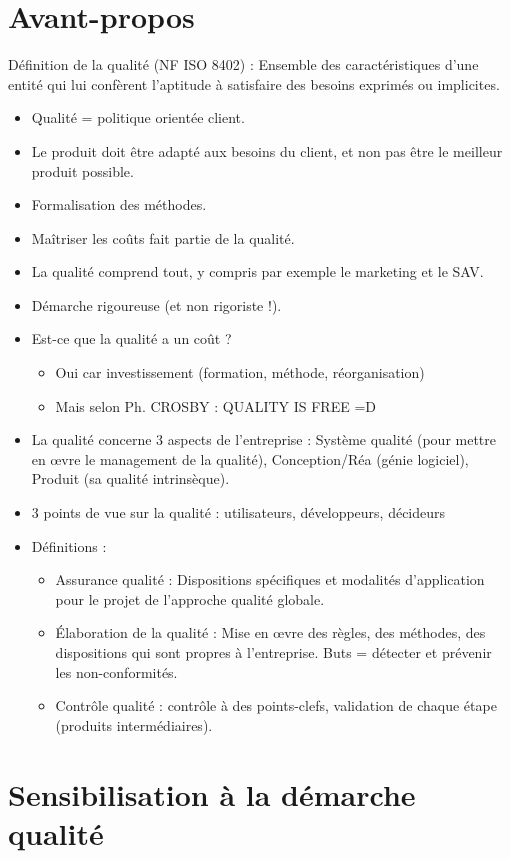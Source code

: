 \part*{Avant-propos}
Définition de la qualité (NF ISO 8402) : Ensemble des caractéristiques d’une entité qui lui confèrent l'aptitude à satisfaire des besoins exprimés ou implicites. \\
\begin{itemize}
\item Qualité = politique orientée client. 
\item Le produit doit être adapté aux besoins du client, et non pas être le meilleur produit possible. 
\item Formalisation des méthodes. 
\item Maîtriser les coûts fait partie de la qualité. 
\item La qualité comprend tout, y compris par exemple le marketing et le SAV. 
\item Démarche rigoureuse (et non rigoriste !). 
\item Est-ce que la qualité a un coût ? 
\begin{itemize}
\item Oui car investissement (formation, méthode, réorganisation)
\item Mais selon Ph. CROSBY : \og QUALITY IS FREE \fg =D
\end{itemize}
\item La qualité concerne 3 aspects de l'entreprise : Système qualité (pour mettre en \oe{}vre le management de la qualité), Conception/Réa (génie logiciel), Produit (sa qualité intrinsèque). 
\item 3 points de vue sur la qualité : utilisateurs, développeurs, décideurs
\item Définitions : 
\begin{itemize}
\item Assurance qualité : Dispositions spécifiques et modalités d'application pour le projet de l'approche qualité globale. 
\item Élaboration de la qualité : Mise en \oe{}vre des règles, des méthodes, des dispositions qui sont propres à l'entreprise. Buts = détecter et prévenir les non-conformités. 
\item Contrôle qualité : contrôle à des points-clefs, validation de chaque étape (produits intermédiaires). 
\end{itemize}
\end{itemize}
\pagebreak
\part{Sensibilisation à la démarche qualité}
